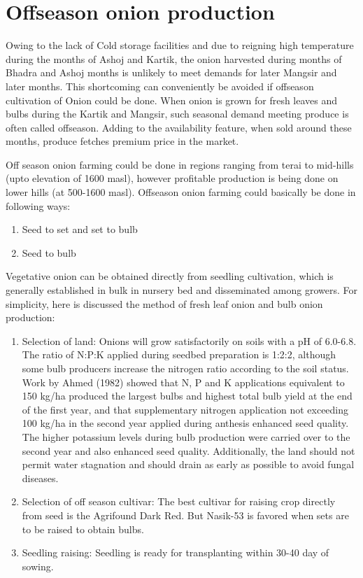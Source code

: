 \documentclass[
]{book}
\providecommand{\tightlist}{%
  \setlength{\itemsep}{0pt}\setlength{\parskip}{0pt}}
\begin{document}
\hypertarget{offseason-onion-production}{%
\section{Offseason onion production}\label{offseason-onion-production}}

Owing to the lack of Cold storage facilities and due to reigning high temperature during the months of Ashoj and Kartik, the onion harvested during months of Bhadra and Ashoj months is unlikely to meet demands for later Mangsir and later months. This shortcoming can conveniently be avoided if offseason cultivation of Onion could be done. When onion is grown for fresh leaves and bulbs during the Kartik and Mangsir, such seasonal demand meeting produce is often called offseason. Adding to the availability feature, when sold around these months, produce fetches premium price in the market.

Off season onion farming could be done in regions ranging from terai to mid-hills (upto elevation of 1600 masl), however profitable production is being done on lower hills (at 500-1600 masl). Offseason onion farming could basically be done in following ways:

\begin{enumerate}
\def\labelenumi{\arabic{enumi}.}
\tightlist
\item
  Seed to set and set to bulb
\item
  Seed to bulb
\end{enumerate}

Vegetative onion can be obtained directly from seedling cultivation, which is generally established in bulk in nursery bed and disseminated among growers. For simplicity, here is discussed the method of fresh leaf onion and bulb onion production:

\begin{enumerate}
\def\labelenumi{\arabic{enumi}.}
\tightlist
\item
  Selection of land: Onions will grow satisfactorily on soils with a pH of 6.0-6.8. The ratio of N:P:K applied during seedbed preparation is 1:2:2, although some bulb producers increase the nitrogen ratio according to the soil status. Work by Ahmed (1982) showed that N, P and K applications equivalent to 150 kg/ha produced the largest bulbs and highest total bulb yield at the end of the first year, and that supplementary nitrogen application not exceeding 100 kg/ha in the second year applied during anthesis enhanced seed quality. The higher potassium levels during bulb production were carried over to the second year and also enhanced seed quality.
  Additionally, the land should not permit water stagnation and should drain as early as possible to avoid fungal diseases.
\item
  Selection of off season cultivar: The best cultivar for raising crop directly from seed is the Agrifound Dark Red. But Nasik-53 is favored when sets are to be raised to obtain bulbs.
\item
  Seedling raising: Seedling is ready for transplanting within 30-40 day of sowing.
\end{enumerate}
\end{document}
